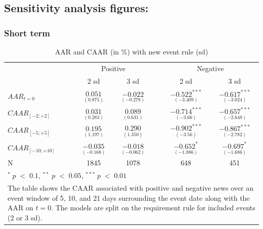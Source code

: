 










\subsection{Sensitivity analysis figures:}

\subsubsection{Short term}


\begin{table}[H]
\centering
\caption{AAR and CAAR (in \%) with new event rule (sd)} 
\begin{tabular}{lccccc}
  \hline  \hline
  & \multicolumn{2}{c}{Positive} &  & \multicolumn{2}{c}{Negative}\\ \cline{2-3} \cline{5-6}  
  & 2 sd & 3 sd & & 2 sd & 3 sd   \\   
 \hline
$AAR_{t=0}$ & $\underset{(0.875)}{0.051}$ & $\underset{(-0.278)}{-0.022}$ & & $\underset{(-3.409)}{-0.522^{***}}$ & $\underset{(-3.024)}{-0.617^{***}}$ \\ 
$CAAR_{[-2;+2]}$  & $\underset{(0.283)}{0.031}$  & $\underset{(0.631)}{0.089}$ & & $\underset{(-3.66)}{-0.714^{***}}$ & $\underset{(-2.648)}{-0.657^{***}}$ \\ 
$CAAR_{[-5;+5]}$  & $\underset{(1.197)}{0.195}$  & $\underset{(1.350)}{0.290}$ & &$\underset{(-3.56)}{-0.902^{***}}$ & $\underset{(-2.782)}{-0.867^{***}}$ \\ 
$CAAR_{[-10;+10]}$  & $\underset{(-0.168)}{-0.035}$  & $\underset{(-0.062)}{-0.018}$ &  & $\underset{(-1.886)}{-0.652^{*}}$ & $\underset{(-1.686)}{-0.697^{*}}$ \\ 
N & 1845 & 1078 & & 648 & 451  \\
   \hline \hline
   \multicolumn{6}{p{12cm}}{ \footnotesize $^* \; p\; <\; 0.1$, $ ^{**} \; p\; <\; 0.05$, $ ^{***} \; p\; <\; 0.01$  } \\
   \multicolumn{6}{p{13cm}}{\footnotesize The table shows the CAAR associated with positive and negative news over an event window of 5, 10, and 21 days surrounding the event date along with the AAR on $t=0$. The models are split on the requirement rule for included events (2 or 3 sd).} \\
   \hline
\end{tabular}
\label{tab:ST_sensitivity}
\end{table}


